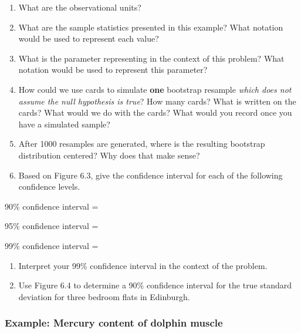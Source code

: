 \documentclass[
]{report}
\newcommand{\rgs}{\vspace{12pt}} %
\newcommand{\rgi}{\hspace{24pt}}  %
\begin{document}
\begin{enumerate}
\def\labelenumi{\arabic{enumi}.}
\item
  What are the observational units?
  \rgs 
\item
  What are the sample statistics presented in this example? What notation would be used to represent each value?
  \rgs 
\item
  What is the parameter representing in the context of this problem? What notation would be used to represent this parameter?
  \rgs 
  \rgs 
\item
  How could we use cards to simulate \textbf{one} bootstrap resample \emph{which does not assume the null hypothesis is true}? How many cards? What is written on the cards? What would we do with the cards? What would you record once you have a simulated sample?
  \rgs 
  \rgs 
  \rgs 
\item
  After 1000 resamples are generated, where is the resulting bootstrap distribution centered? Why does that make sense?
  \rgs 
  \rgs 
\item
  Based on Figure 6.3, give the confidence interval for each of the following confidence levels.
\end{enumerate}

\rgi 90\% confidence interval =
\rgs 

\rgi 95\% confidence interval =
\rgs 

\rgi 99\% confidence interval =
\rgs 

\begin{enumerate}
\def\labelenumi{\arabic{enumi}.}
\setcounter{enumi}{6}
\item
  Interpret your 99\% confidence interval in the context of the problem.
  \rgs 
  \rgs 
\item
  Use Figure 6.4 to determine a 90\% confidence interval for the true standard deviation for three bedroom flats in Edinburgh.
  \rgs 
\end{enumerate}

\hypertarget{example-mercury-content-of-dolphin-muscle}{%
\subsubsection*{Example: Mercury content of dolphin muscle}\label{example-mercury-content-of-dolphin-muscle}}
\end{document}
